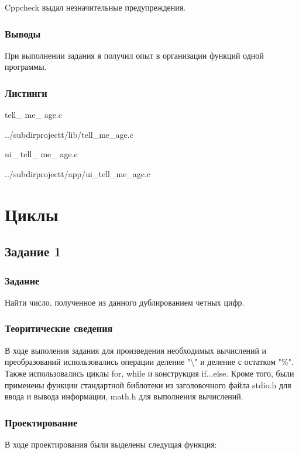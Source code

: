 \documentclass[12pt,a4paper]{report}
\begin{document}
		\vspace{\baselineskip}
		
 Cppcheck выдал незначительные предупреждения.		
\subsection{Выводы}

При выполнении задания я получил опыт в организации функций одной программы.

\subsection*{Листинги}
tell\_ me\_ age.c

{../subdirprojectt/lib/tell_me_age.c}

\vspace{\baselineskip}

ui\_ tell\_ me\_ age.c

{../subdirprojectt/app/ui_tell_me_age.c}


\chapter{Циклы}
\section{Задание 1}
\subsection{Задание}

Найти число, полученное из данного дублированием четных цифр.

\subsection{Теоритические сведения}

В ходе выполения задания для произведения необходимых вычислений и преобразований использовались операции деление "\textbackslash" и деление с остатком "\%". Также использовались циклы for, while и конструкция if...else. Кроме того, были применены функции стандартной библотеки из заголовочного файла stdio.h для ввода и вывода информации, math.h для выполнения вычислений.


\subsection{Проектирование}

В ходе проектирования были выделены следущая функция:
\end{document}
